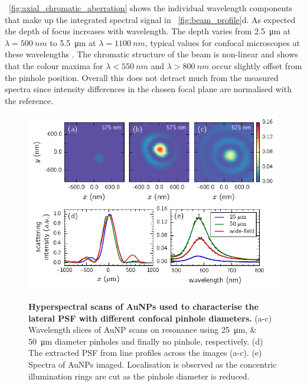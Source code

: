 \documentclass{article}
\begin{document}
\figurename~\ref{fig:axial_chromatic_aberration} shows the individual wavelength components that make up the integrated spectral signal in \figurename~\ref{fig:beam_profile}d. As expected the depth of focus increases with wavelength. The depth varies from \SI{2.5}{\micro\metre} at $\lambda=\SI{500}{nm}$ to \SI{5.5}{\micro\metre} at $\lambda=\SI{1100}{nm}${\color{red}, typical values for confocal microscopes at these wavelengths \cite{}.} The chromatic structure of the beam is non-linear and shows that the colour maxima for $\lambda<\SI{550}{nm}$ and $\lambda>\SI{800}{nm}$ occur slightly offset from the pinhole position. Overall this does not detract much from the measured spectra since intensity differences in the chosen focal plane are normalised with the reference.

\begin{figure}[bt]
\centering
{\includegraphics{figures/lateral_aunp_scans}}
{\caption[Hyperspectral scans of AuNPs used to characterise the lateral PSF with different confocal pinhole diameters.]{\textbf{Hyperspectral scans of AuNPs used to characterise the lateral PSF with different confocal pinhole diameters.} (a-c) Wavelength slices of AuNP scans on resonance using \SIlist{25;50}{\micro\metre} diameter pinholes and finally no pinhole, respectively. (d) The extracted PSF from line profiles across the images (a-c). (e) Spectra of AuNPs imaged. Localisation is observed as the concentric illumination rings are cut as the pinhole diameter is reduced.}
\label{fig:lateral_psf}}
\end{figure}
\end{document}
